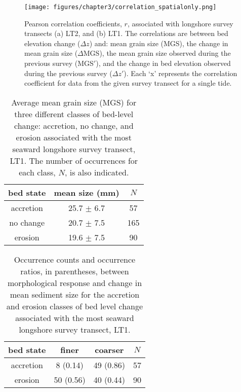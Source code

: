 \begin{figure}[tbp] %
	\begin{center}
	\texttt{[image: figures/chapter3/correlation\_spatialonly.png]}
	\caption[Spatial correlation coefficients]{Pearson correlation coefficients, $r$, associated with longshore survey transects (a) LT2, and (b) LT1. The correlations are between bed elevation change ($\Delta z$) and: mean grain size (MGS), the change in mean grain size ($\Delta$MGS), the mean grain size observed during the previous survey (MGS$'$), and the change in bed elevation observed during the previous survey ($\Delta z'$). Each `x' represents the correlation coefficient for data from the given survey transect for a single tide.}
	\label{fig:corr_coeffs_all}
	\end{center}
\end{figure}

\begin{table}[tbp!]
	\caption[Mean grain size correspoonding to bed accretion, no change, and erosion]{Average mean grain size (MGS) for three different classes of bed-level change: accretion, no change, and erosion associated with the most seaward longshore survey transect, LT1. The number of occurrences for each class, $N$, is also indicated.} 
	\label{table:dz_mgs}
	\centering
	\begin{tabular}{ccc}
		\hline
		bed state & mean size (mm) & $N$\\
		\hline
		accretion & 25.7 $\pm$ 6.7 & 57\\
		no change & 20.7 $\pm$ 7.5 & 165\\
		erosion   & 19.6 $\pm$ 7.5 & 90\\
		\hline
	\end{tabular}
\end{table}

\begin{table}[tbp!]
	\caption[Occurrence counts of bed fining and coarsening during bed accretion and erosion]{Occurrence counts and occurrence ratios, in parentheses, between morphological response and change in mean sediment size for the accretion and erosion classes of bed level change associated with the most seaward longshore survey transect, LT1.} 
	\label{table:dz_dmgs}
	\centering
	\begin{tabular}{cccc}
		\hline
		bed state & finer & coarser & $N$\\
		\hline
		accretion & 8 (0.14) & 49 (0.86) & 57\\
		erosion & 50 (0.56) & 40 (0.44) & 90\\
		\hline
	\end{tabular}
\end{table}


